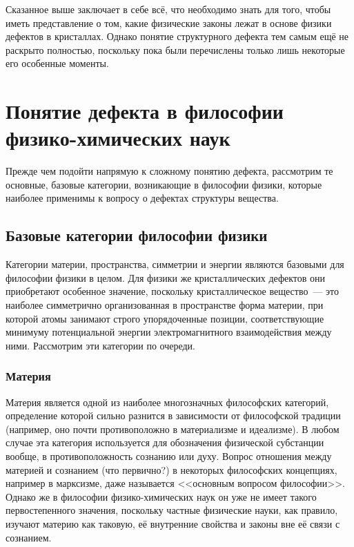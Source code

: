 \documentclass[a4paper, 14pt, titlepage]{extarticle}
\begin{document}

  Сказанное выше заключает в себе всё, что необходимо знать для того, чтобы иметь представление о
  том, какие физические законы лежат в основе физики дефектов в кристаллах. Однако понятие
  структурного дефекта тем самым ещё не раскрыто полностью, поскольку пока были перечислены только
  лишь некоторые его особенные моменты.

  \section{Понятие дефекта в философии физико-химических наук}

  Прежде чем подойти напрямую к сложному понятию дефекта, рассмотрим те основные, базовые категории,
  возникающие в философии физики, которые наиболее применимы к вопросу о дефектах структуры вещества.

  \subsection{Базовые категории философии физики}

  Категории материи, пространства, симметрии и энергии являются базовыми для философии физики в
  целом. Для физики же кристаллических дефектов они приобретают особенное значение, поскольку
  кристаллическое вещество~--- это наиболее симметрично организованная в пространстве форма материи,
  при которой атомы занимают строго упорядоченные позиции, соответствующие минимуму потенциальной
  энергии электромагнитного взаимодействия между ними. Рассмотрим эти категории по очереди.

  \subsubsection{Материя}

  Материя является одной из наиболее многозначных философских категорий, определение которой сильно
  разнится в зависимости от философской традиции (например, оно почти противоположно в материализме
  и идеализме). В любом случае эта категория используется для обозначения физической субстанции
  вообще, в противоположность сознанию или духу. Вопрос отношения между материей и сознанием (что
  первично?) в некоторых философских концепциях, например в марксизме, даже называется <<основным
  вопросом философии>>. Однако же в философии физико-химических наук он уже не имеет такого
  первостепенного значения, поскольку частные физические науки, как правило, изучают материю как
  таковую, её внутренние свойства и законы вне её связи с сознанием.
\end{document}
